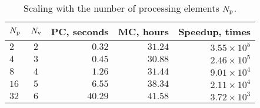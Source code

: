 \begin{table}[b]
  \vspace{-15pt}
  \centering
  \caption{Scaling with the number of processing elements ${N_\text{p}}$.}
  \begin{tabular}{lcrrr}
    \toprule
    ${N_\text{p}}$ & ${N_\text{v}}$ & PC, seconds & MC, hours & Speedup, times \\
    \midrule
    $ 2$ & $2$ & $ 0.32$ & $31.24$ & $3.55 \times 10^5$ \\
    $ 4$ & $3$ & $ 0.45$ & $30.88$ & $2.46 \times 10^5$ \\
    $ 8$ & $4$ & $ 1.26$ & $31.44$ & $9.01 \times 10^4$ \\
    $16$ & $5$ & $ 6.55$ & $38.34$ & $2.11 \times 10^4$ \\
    $32$ & $6$ & $40.29$ & $41.58$ & $3.72 \times 10^3$ \\
    \bottomrule
  \end{tabular}
  \vspace{-5pt}
\end{table}
